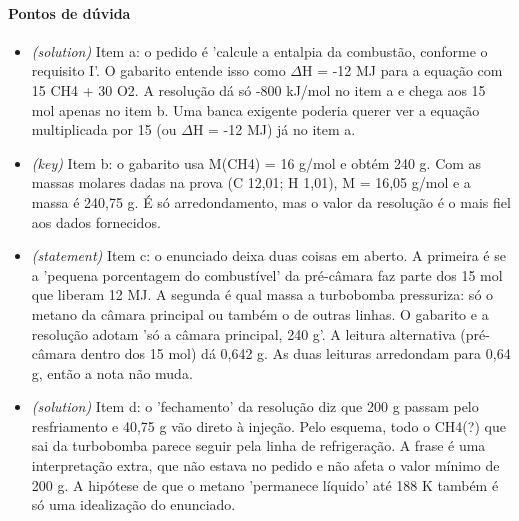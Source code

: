 \documentclass{article}%
\begin{document}
\paragraph{Pontos de dúvida}%
\begin{itemize}%
\item%
\textit{(solution)} Item a: o pedido é 'calcule a entalpia da combustão, conforme o requisito I'. O gabarito entende isso como $\Delta$H = -12 MJ para a equação com 15 CH4 + 30 O2. A resolução dá só -800 kJ/mol no item a e chega aos 15 mol apenas no item b. Uma banca exigente poderia querer ver a equação multiplicada por 15 (ou $\Delta$H = -12 MJ) já no item a.%
\item%
\textit{(key)} Item b: o gabarito usa M(CH4) = 16 g/mol e obtém 240 g. Com as massas molares dadas na prova (C 12,01; H 1,01), M = 16,05 g/mol e a massa é 240,75 g. É só arredondamento, mas o valor da resolução é o mais fiel aos dados fornecidos.%
\item%
\textit{(statement)} Item c: o enunciado deixa duas coisas em aberto. A primeira é se a 'pequena porcentagem do combustível' da pré{-}câmara faz parte dos 15 mol que liberam 12 MJ. A segunda é qual massa a turbobomba pressuriza: só o metano da câmara principal ou também o de outras linhas. O gabarito e a resolução adotam 'só a câmara principal, 240 g'. A leitura alternativa (pré{-}câmara dentro dos 15 mol) dá 0,642 g. As duas leituras arredondam para 0,64 g, então a nota não muda.%
\item%
\textit{(solution)} Item d: o 'fechamento' da resolução diz que 200 g passam pelo resfriamento e 40,75 g vão direto à injeção. Pelo esquema, todo o CH4(?) que sai da turbobomba parece seguir pela linha de refrigeração. A frase é uma interpretação extra, que não estava no pedido e não afeta o valor mínimo de 200 g. A hipótese de que o metano 'permanece líquido' até 188 K também é só uma idealização do enunciado.%
\end{itemize}%
\end{document}
